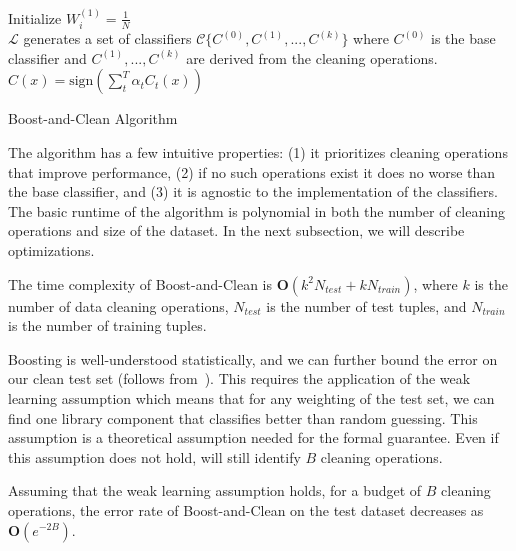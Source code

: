 \begin{algorithm}
Initialize $W^{(1)}_i = \frac{1}{N}$\\

$\mathcal{L}$ generates a set of classifiers $\mathcal{C} \{C^{(0)}, C^{(1)},...,C^{(k)}\}$ where $C^{(0)}$ is the base classifier and $C^{(1)},...,C^{(k)}$ are derived from the cleaning operations.\\

\Return $C(x) = \text{sign}(\sum_t^T \alpha_t C_t(x) )$
\caption{Boost-and-Clean Algorithm}
\label{alg:rsa}
\end{algorithm}

The algorithm has a few intuitive properties: (1) it prioritizes cleaning operations that improve performance, (2) if no such operations exist it does no worse than the base classifier, and (3) it is agnostic to the implementation of the classifiers.
The basic runtime of the algorithm is polynomial in both the number of cleaning operations and size of the dataset. In the next subsection, we will describe optimizations.

\begin{proposition}
The time complexity of Boost-and-Clean is $\mathbf{O}(k^2 N_{test} + k N_{train})$, where $k$ is the number of data cleaning operations, $N_{test}$ is the number of test tuples, and $N_{train}$ is the number of training tuples.
\end{proposition}

Boosting is well-understood statistically, and we can further bound the error on our clean test set (follows from~\cite{schapire2003boosting}). This requires the application of the weak learning assumption which means that for any weighting of the test set, we can find one library component that classifies better than random guessing. This assumption is a theoretical assumption needed for the formal guarantee. Even if this assumption does not hold, \sys will still identify $B$ cleaning operations.

\begin{proposition}
Assuming that the weak learning assumption holds, for a budget of $B$ cleaning operations, the error rate of Boost-and-Clean on the test dataset decreases as $\mathbf{O}(e^{-2B})$.
\end{proposition}



